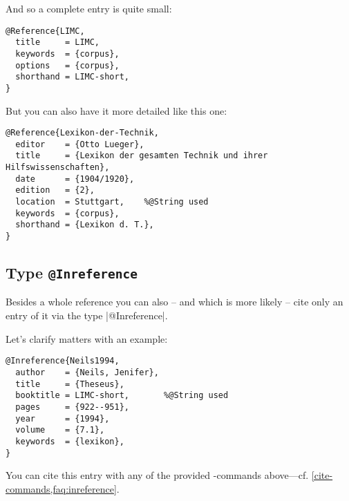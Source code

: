 \documentclass[a4paper,
10pt,
greek,
french,
spanish,
italian,
ngerman,
english
]{ltxdoc}
\begin{document}
And so a complete entry is quite small:
\begin{lstlisting}[style=bibentry,label=LIMC,caption={{@}Reference\{LIMC,…\} }]
@Reference{LIMC,
  title     = LIMC,
  keywords  = {corpus},
  options   = {corpus},
  shorthand = LIMC-short,
}
\end{lstlisting}
 
But you can also have it  more detailed  like this one:
\begin{lstlisting}[style=bibentry,label=Lexikon-der-Technik,caption={{@}Reference\{Lexikon-der-Technik,…\} }]
@Reference{Lexikon-der-Technik,
  editor    = {Otto Lueger},
  title     = {Lexikon der gesamten Technik und ihrer Hilfswissenschaften},
  date      = {1904/1920},
  edition   = {2},
  location  = Stuttgart, 	%@String used
  keywords  = {corpus},
  shorthand = {Lexikon d. T.},
}
\end{lstlisting}

 \subsection{Type \texttt{@Inreference}}\label{inreference}
Besides a whole reference you can also -- and which is more likely -- cite only an entry of it via the type  |@Inreference|.

Let’s clarify matters with an example:
\begin{lstlisting}[style=bibentry,label=Neils1994,caption={{@}Inreference\{Neils1994,…\} }]
@Inreference{Neils1994,
  author    = {Neils, Jenifer},
  title     = {Theseus},
  booktitle = LIMC-short,		%@String used
  pages     = {922--951},
  year      = {1994},
  volume    = {7.1},
  keywords  = {lexikon},
}
\end{lstlisting}
You can cite this entry with any of the provided -commands above---cf. \cref{cite-commands,faq:inreference}.
\end{document}
